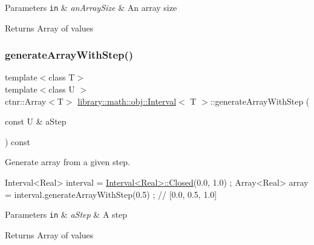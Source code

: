 \begin{DoxyParams}[1]{Parameters}
\mbox{\tt in}  & {\em an\+Array\+Size} & An array size \\
\hline
\end{DoxyParams}
\begin{DoxyReturn}{Returns}
Array of values 
\end{DoxyReturn}
\mbox{\label{classlibrary_1_1math_1_1obj_1_1_interval_ad453aeaec68c18421a7c93ac7c14fa48}} 
\subsubsection{\texorpdfstring{generate\+Array\+With\+Step()}{generateArrayWithStep()}}
{\footnotesize\ttfamily template$<$class T$>$ \\
template$<$class U $>$ \\
ctnr\+::\+Array$<$T$>$ \hyperlink{classlibrary_1_1math_1_1obj_1_1_interval}{library\+::math\+::obj\+::\+Interval}$<$ T $>$\+::generate\+Array\+With\+Step (\begin{DoxyParamCaption}\item[{const U \&}]{a\+Step }\end{DoxyParamCaption}) const}



Generate array from a given step. 


\begin{DoxyCode}
Interval<Real> interval = \hyperlink{classlibrary_1_1math_1_1obj_1_1_interval_aae8bb2b89af450729338d48563def4d7}{Interval<Real>::Closed}(0.0, 1.0) ;
Array<Real> array = interval.generateArrayWithStep(0.5) ; \textcolor{comment}{// [0.0, 0.5, 1.0]}
\end{DoxyCode}



\begin{DoxyParams}[1]{Parameters}
\mbox{\tt in}  & {\em a\+Step} & A step \\
\hline
\end{DoxyParams}
\begin{DoxyReturn}{Returns}
Array of values 
\end{DoxyReturn}
\mbox{\label{classlibrary_1_1math_1_1obj_1_1_interval_a2f23ca14d71c454417270218132423de}} 
